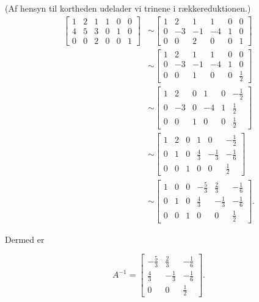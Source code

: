 \begin{solution} (Af hensyn til kortheden udelader vi trinene i rækkereduktionen.)
\[
\begin{aligned}
{\left[\begin{array}{llllll}
1 & 2 & 1 & 1 & 0 & 0 \\
4 & 5 & 3 & 0 & 1 & 0 \\
0 & 0 & 2 & 0 & 0 & 1
\end{array}\right] } & \sim\left[\begin{array}{cccccc}
1 & 2 & 1 & 1 & 0 & 0 \\
0 & -3 & -1 & -4 & 1 & 0 \\
0 & 0 & 2 & 0 & 0 & 1
\end{array}\right] \\
& \sim\left[\begin{array}{cccccc}
1 & 2 & 1 & 1 & 0 & 0 \\
0 & -3 & -1 & -4 & 1 & 0 \\
0 & 0 & 1 & 0 & 0 & \frac{1}{2}
\end{array}\right] \\
& \sim\left[\begin{array}{cccccc}
1 & 2 & 0 & 1 & 0 & -\frac{1}{2} \\
0 & -3 & 0 & -4 & 1 & \frac{1}{2} \\
0 & 0 & 1 & 0 & 0 & \frac{1}{2}
\end{array}\right] \\
& \sim\left[\begin{array}{cccccc}
1 & 2 & 0 & 1 & 0 & -\frac{1}{2} \\
0 & 1 & 0 & \frac{4}{3} & -\frac{1}{3} & -\frac{1}{6} \\
0 & 0 & 1 & 0 & 0 & \frac{1}{2}
\end{array}\right] \\
& \sim\left[\begin{array}{cccccc}
1 & 0 & 0 & -\frac{5}{3} & \frac{2}{3} & -\frac{1}{6} \\
0 & 1 & 0 & \frac{4}{3} & -\frac{1}{3} & -\frac{1}{6} \\
0 & 0 & 1 & 0 & 0 & \frac{1}{2}
\end{array}\right] .
\end{aligned}
\]

Dermed er

\[
A^{-1}=\left[\begin{array}{ccc}
-\frac{5}{3} & \frac{2}{3} & -\frac{1}{6} \\
\frac{4}{3} & -\frac{1}{3} & -\frac{1}{6} \\
0 & 0 & \frac{1}{2}
\end{array}\right] .
\]

\end{solution}

